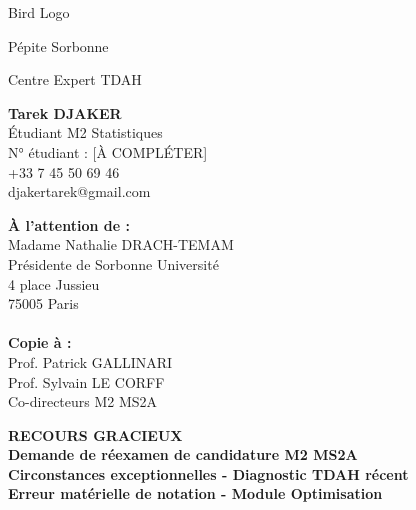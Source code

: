 \documentclass[12pt,french,a4paper]{article}
\begin{document}
\begin{center}
\begin{minipage}{0.3\textwidth}
\centering
\fbox{\rule{0pt}{1.5cm}\rule{2cm}{0pt}}
\small Bird Logo
\end{minipage}
\begin{minipage}{0.3\textwidth}
\centering
\fbox{\rule{0pt}{1.5cm}\rule{2cm}{0pt}}
\small Pépite Sorbonne
\end{minipage}
\begin{minipage}{0.3\textwidth}
\centering
\fbox{\rule{0pt}{1.5cm}\rule{2cm}{0pt}}
\small Centre Expert TDAH
\end{minipage}
\end{center}

\vspace{1cm}

\noindent
\begin{minipage}{0.5\textwidth}
\textbf{Tarek DJAKER}\\
Étudiant M2 Statistiques\\
N° étudiant : [À COMPLÉTER]\\
+33 7 45 50 69 46\\
djakertarek@gmail.com\\
[ADRESSE COMPLÈTE]
\end{minipage}
\hfill
\begin{minipage}{0.4\textwidth}
\raggedleft
\textbf{À l'attention de :}\\
Madame Nathalie DRACH-TEMAM\\
Présidente de Sorbonne Université\\
4 place Jussieu\\
75005 Paris\\
\\
\textbf{Copie à :}\\
Prof. Patrick GALLINARI\\
Prof. Sylvain LE CORFF\\
Co-directeurs M2 MS2A
\end{minipage}

\vspace{1.5cm}

\begin{center}
\Large\textbf{RECOURS GRACIEUX}\\
\large\textbf{Demande de réexamen de candidature M2 MS2A}\\
\normalsize\textbf{Circonstances exceptionnelles - Diagnostic TDAH récent}\\
\normalsize\textbf{Erreur matérielle de notation - Module Optimisation}
\end{center}
\end{document}
